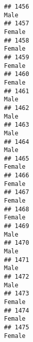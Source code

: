 \documentclass[]{article}
\begin{document}
\begin{verbatim}
## 1456                                                                                                                            Male
## 1457                                                                                                                          Female
## 1458                                                                                                                          Female
## 1459                                                                                                                          Female
## 1460                                                                                                                          Female
## 1461                                                                                                                            Male
## 1462                                                                                                                            Male
## 1463                                                                                                                            Male
## 1464                                                                                                                            Male
## 1465                                                                                                                          Female
## 1466                                                                                                                          Female
## 1467                                                                                                                          Female
## 1468                                                                                                                          Female
## 1469                                                                                                                            Male
## 1470                                                                                                                            Male
## 1471                                                                                                                            Male
## 1472                                                                                                                            Male
## 1473                                                                                                                          Female
## 1474                                                                                                                          Female
## 1475                                                                                                                          Female

\end{verbatim}
\end{document}
